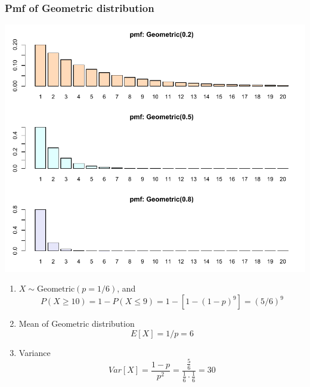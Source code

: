 \documentclass[slidestop,compress,mathserif]{beamer}
\begin{document}
\begin{frame}\frametitle{Pmf of Geometric distribution}

\vspace{-0.5cm}
\begin{center}
\includegraphics[scale = 0.63]{figures/pmf4}
\end{center}

\end{frame}



\begin{frame}%


\pause
\begin{enumerate}
\item $X \sim \text{Geometric}(p=1/6)$, and
\[ P(X \geq 10) = 1- P(X \leq 9) = 1 - [1 - (1-p)^9] = (5/6)^9 \]
\pause\vspace{-0.5cm}
\item Mean of Geometric distribution
\[E[X] = 1/p = 6\]
\pause\vspace{-0.5cm}
\item Variance
\[Var[X] = \frac{1-p}{p^2} = \frac{\frac{5}{6}}{\frac{1}{6}\cdot \frac{1}{6}} = 30\]
\end{enumerate}


\end{frame}
\end{document}
